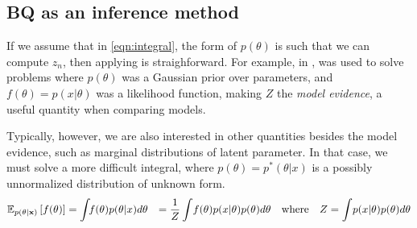 \subsection{BQ as an inference method}

If we assume that in \eqref{eqn:integral}, the form of $p(\theta)$ is such that we can compute $z_n$, then applying \bq{} is straighforward.  For example, in \cite{BZMonteCarlo}, \bq{} was used to solve problems where $p(\theta)$ was a Gaussian prior over parameters, and $f(\theta) = p( x | \theta )$ was a likelihood function, making $Z$ the \emph{model evidence}, a useful quantity when comparing models.

Typically, however, we are also interested in other quantities besides the model evidence, such as marginal distributions of latent parameter.  In that case, we must solve a more difficult integral, where $p(\theta) = p^* ( \theta | x )$ is a possibly unnormalized distribution of unknown form.
%
%
%
%
\begin{align}
\mathbb{E}_{p(\theta | {\bf{x}})} \left[ {f(\theta)} \right] & = \int \!\! f(\theta) p(\theta | x ) d\theta 
& = \frac{1}{Z} \int \! f(\theta) p( x | \theta ) p( \theta ) d\theta \quad \textrm{where}  \quad  Z = \int \! p( x | \theta ) p( \theta ) d\theta
\label{eq:post_marginal}
\end{align}
%
%
%
